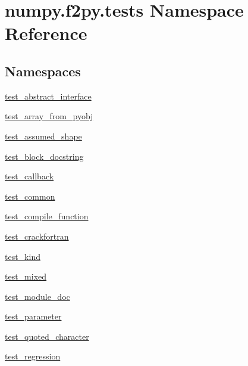 \hypertarget{namespacenumpy_1_1f2py_1_1tests}{}\section{numpy.\+f2py.\+tests Namespace Reference}
\label{namespacenumpy_1_1f2py_1_1tests}
\subsection*{Namespaces}
\begin{DoxyCompactItemize}
\item 
 \hyperlink{namespacenumpy_1_1f2py_1_1tests_1_1test__abstract__interface}{test\+\_\+abstract\+\_\+interface}
\item 
 \hyperlink{namespacenumpy_1_1f2py_1_1tests_1_1test__array__from__pyobj}{test\+\_\+array\+\_\+from\+\_\+pyobj}
\item 
 \hyperlink{namespacenumpy_1_1f2py_1_1tests_1_1test__assumed__shape}{test\+\_\+assumed\+\_\+shape}
\item 
 \hyperlink{namespacenumpy_1_1f2py_1_1tests_1_1test__block__docstring}{test\+\_\+block\+\_\+docstring}
\item 
 \hyperlink{namespacenumpy_1_1f2py_1_1tests_1_1test__callback}{test\+\_\+callback}
\item 
 \hyperlink{namespacenumpy_1_1f2py_1_1tests_1_1test__common}{test\+\_\+common}
\item 
 \hyperlink{namespacenumpy_1_1f2py_1_1tests_1_1test__compile__function}{test\+\_\+compile\+\_\+function}
\item 
 \hyperlink{namespacenumpy_1_1f2py_1_1tests_1_1test__crackfortran}{test\+\_\+crackfortran}
\item 
 \hyperlink{namespacenumpy_1_1f2py_1_1tests_1_1test__kind}{test\+\_\+kind}
\item 
 \hyperlink{namespacenumpy_1_1f2py_1_1tests_1_1test__mixed}{test\+\_\+mixed}
\item 
 \hyperlink{namespacenumpy_1_1f2py_1_1tests_1_1test__module__doc}{test\+\_\+module\+\_\+doc}
\item 
 \hyperlink{namespacenumpy_1_1f2py_1_1tests_1_1test__parameter}{test\+\_\+parameter}
\item 
 \hyperlink{namespacenumpy_1_1f2py_1_1tests_1_1test__quoted__character}{test\+\_\+quoted\+\_\+character}
\item 
 \hyperlink{namespacenumpy_1_1f2py_1_1tests_1_1test__regression}{test\+\_\+regression}
\item 

\end{DoxyCompactItemize}
